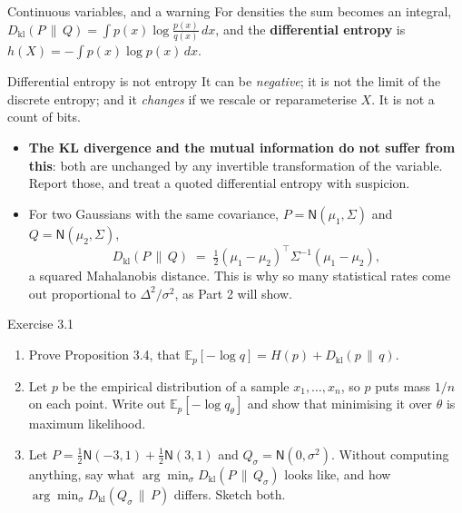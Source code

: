 \documentclass[aspectratio=169,9pt]{beamer}
\newcommand{\orange}[1]{\textcolor{AmazonOrange}{\textbf{#1}}}
\newcommand{\blue}[1]{\textcolor{densityblue}{\textbf{#1}}}
\newcommand{\muted}[1]{\textcolor{EPICMuted}{#1}}
\newcommand{\KL}[2]{D_{\mathrm{kl}}\!\left(#1 \,\|\, #2\right)}
\newcommand{\E}{\mathbb{E}}
\begin{document}
\begin{frame}{Continuous variables, and a warning}
For densities the sum becomes an integral, $\KL{P}{Q} = \int p(x)\log\frac{p(x)}{q(x)}\,dx$, and the
\blue{differential entropy} is $h(X) = -\int p(x)\log p(x)\,dx$.
\pause
\vspace{0.2cm}
\begin{alertblock}{Differential entropy is not entropy}
It can be \textit{negative}; it is not the limit of the discrete entropy; and it \textit{changes} if we
rescale or reparameterise $X$. It is not a count of bits.
\end{alertblock}
\pause
\vspace{0.15cm}
\begin{itemize}
    \item \orange{The KL divergence and the mutual information do not suffer from this}: both are unchanged
    by any invertible transformation of the variable. Report those, and treat a quoted differential entropy
    with suspicion.
    \pause
    \item For two Gaussians with the same covariance, $P = \mathsf{N}(\mu_1,\Sigma)$ and
    $Q = \mathsf{N}(\mu_2,\Sigma)$,
    \[
        \KL{P}{Q} \;=\; \tfrac12 (\mu_1-\mu_2)^\top \Sigma^{-1} (\mu_1-\mu_2),
    \]
    a squared Mahalanobis distance. \muted{This is why so many statistical rates come out proportional to
    $\Delta^2/\sigma^2$, as Part 2 will show.}
\end{itemize}
\end{frame}

\begin{frame}{Exercise 3.1}
\begin{enumerate}
    \item Prove Proposition 3.4, that $\E_p[-\log q] = H(p) + \KL{p}{q}$.
    \pause
    \item Let $p$ be the empirical distribution of a sample $x_1,\dots,x_n$, so $p$ puts mass $1/n$ on each
    point. Write out $\E_p[-\log q_\theta]$ and show that minimising it over $\theta$ is maximum likelihood.
    \pause
    \item Let $P = \tfrac12 \mathsf{N}(-3,1) + \tfrac12 \mathsf{N}(3,1)$ and $Q_\sigma = \mathsf{N}(0,\sigma^2)$.
    Without computing anything, say what $\arg\min_\sigma \KL{P}{Q_\sigma}$ looks like, and how
    $\arg\min_\sigma \KL{Q_\sigma}{P}$ differs. Sketch both.
\end{enumerate}
\end{frame}
\end{document}

